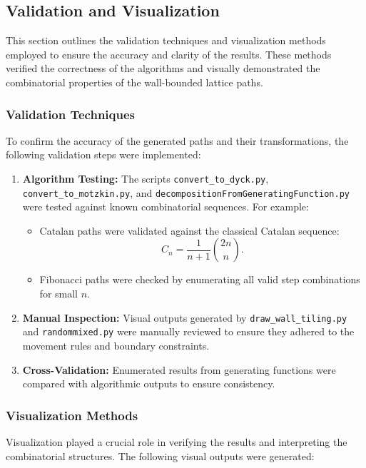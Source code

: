 \documentclass{article}
\begin{document}
\subsection{Validation and Visualization}

This section outlines the validation techniques and visualization methods employed to ensure the accuracy and clarity of the results. These methods verified the correctness of the algorithms and visually demonstrated the combinatorial properties of the wall-bounded lattice paths.

\subsubsection{Validation Techniques}

To confirm the accuracy of the generated paths and their transformations, the following validation steps were implemented:

\begin{enumerate}
    \item \textbf{Algorithm Testing:} 
    The scripts \texttt{convert\_to\_dyck.py}, \texttt{convert\_to\_motzkin.py}, and \texttt{decompositionFromGeneratingFunction.py} were tested against known combinatorial sequences. For example:
    \begin{itemize}
        \item Catalan paths were validated against the classical Catalan sequence:
        \[
        C_n = \frac{1}{n+1} \binom{2n}{n}.
        \]
        \item Fibonacci paths were checked by enumerating all valid step combinations for small \(n\).
    \end{itemize}
    \item \textbf{Manual Inspection:}
    Visual outputs generated by \texttt{draw\_wall\_tiling.py} and \texttt{randommixed.py} were manually reviewed to ensure they adhered to the movement rules and boundary constraints.
    \item \textbf{Cross-Validation:}
    Enumerated results from generating functions were compared with algorithmic outputs to ensure consistency.
\end{enumerate}

\subsubsection{Visualization Methods}

Visualization played a crucial role in verifying the results and interpreting the combinatorial structures. The following visual outputs were generated:
\end{document}
